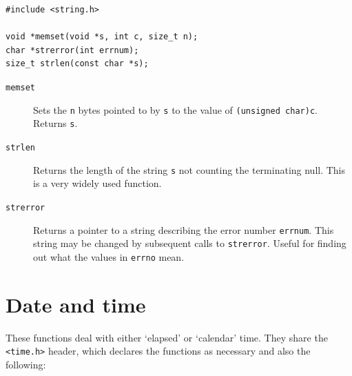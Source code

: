    \begin{Verbatim}
#include <string.h>

void *memset(void *s, int c, size_t n);
char *strerror(int errnum);
size_t strlen(const char *s);
\end{Verbatim}

   \begin{description}
    \item[\texttt{memset}] Sets the \texttt{n}  bytes  pointed  to  by  \texttt{s}  to
     the  value  of \texttt{(unsigned char)c}.  Returns
     \texttt{s}.

    \item[\texttt{strlen}] Returns the length of  the  string  \texttt{s}  not  counting  the
     terminating null.  This is a very widely used function.

    \item[\texttt{strerror}] Returns a pointer to a string describing the error number
     \texttt{errnum}.   This  string may be changed by subsequent calls to
     \texttt{strerror}.  Useful for finding out what the  values  in
     \texttt{errno} mean.
   \end{description}

  

 
        \section{Date and time}
        

  

  These functions deal with either `elapsed' or `calendar' time.
   They share the \texttt{<time.h>} header, which declares the
   functions as necessary and also the following:


